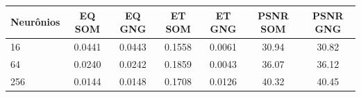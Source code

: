 \begin{tabular}{lcccccc}
\toprule
Neurônios & EQ SOM & EQ GNG & ET SOM & ET GNG & PSNR SOM & PSNR GNG\\
\midrule
16 & 0.0441 & 0.0443 & 0.1558 & 0.0061 & 30.94 & 30.82\\
64 & 0.0240 & 0.0242 & 0.1859 & 0.0043 & 36.07 & 36.12\\
256 & 0.0144 & 0.0148 & 0.1708 & 0.0126 & 40.32 & 40.45\\
\bottomrule
\end{tabular}
